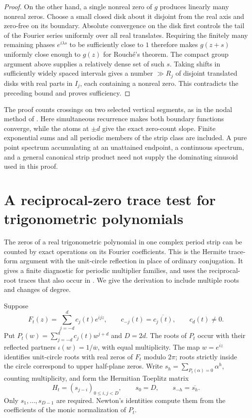\documentclass[11pt]{article}
\begin{document}
\begin{proof}
On the other hand, a single nonreal zero of $g$ produces linearly
many nonreal zeros. Choose a small closed disk about it disjoint from
the real axis and zero-free on its boundary. Absolute convergence on
the disk first controls the tail of the Fourier series uniformly over
all real translates. Requiring the finitely many remaining phases
$e^{i\lambda s}$ to be sufficiently close to $1$ therefore makes
$g(z+s)$ uniformly close enough to $g(z)$ for Rouch\'e's theorem.
The compact group argument above supplies a relatively dense set of
such $s$. Taking shifts in sufficiently widely spaced intervals gives
a number $\gg R_j$ of disjoint translated disks with real parts in
$I_j$, each containing a nonreal zero. This contradicts the preceding
bound and proves sufficiency.
\end{proof}

The proof counts crossings on two selected vertical segments, as
in the nodal method of \cite{vm103}. Here simultaneous recurrence
makes both boundary functions converge, while the atoms at $\pm d$
give the exact zero-count slope. Finite exponential sums and all
periodic members of the strip class are included. A pure point
spectrum accumulating at an unattained endpoint, a continuous
spectrum, and a general canonical strip product need not supply
the dominating sinusoid used in this proof.

\section{A reciprocal-zero trace test for trigonometric polynomials}
\label{sec:trace-circle}

The zeros of a real trigonometric polynomial in one complex period
strip can be counted by exact operations on its Fourier coefficients.
This is the Hermite trace-form argument with the unit-circle reflection
in place of ordinary conjugation. It gives a finite diagnostic for
periodic multiplier families, and uses the reciprocal-root traces that
also occur in \cite{vm002}. We give the derivation to include multiple
roots and changes of degree.

Suppose
\[
 F_t(z)=\sum_{j=-d}^{d}c_j(t)e^{ijz},\qquad
 c_{-j}(t)=\overline{c_j(t)},\qquad c_d(t)\ne0.
\]
Put $P_t(w)=\sum_{j=-d}^{d}c_j(t)w^{j+d}$ and $D=2d$.
The roots of $P_t$ occur with their reflected partners
$\iota(w)=1/\overline w$, with equal multiplicity.
The map $w=e^{iz}$ identifies unit-circle roots with real zeros of $F_t$
modulo $2\pi$; roots strictly inside the circle correspond to upper
half-plane zeros. Write $s_h=\sum_{P_t(\alpha)=0}\alpha^h$, counting
multiplicity, and form the Hermitian Toeplitz matrix
\[
 H_t=(s_{j-i})_{0\le i,j<D},\qquad s_0=D,\qquad
 s_{-h}=\overline{s_h}.
\]
Only $s_1,\ldots,s_{D-1}$ are required. Newton's identities compute them
from the coefficients of the monic normalization of $P_t$.
\end{document}
